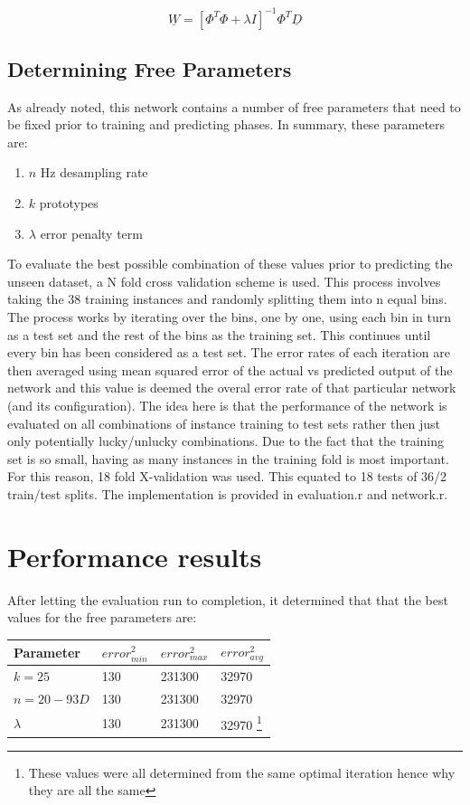 \documentclass[twocolumn]{article}
\begin{document}
\[
\underline{W} = [\Phi^T \Phi + \lambda I]^{-1} \Phi^T \underline{D}
\]

\subsection{Determining Free Parameters}
As already noted, this network contains a number of free parameters that need to be fixed prior to training and predicting phases.
In summary, these parameters are:

\begin{enumerate}
	\item $n$ Hz desampling rate
	\item $k$ prototypes
	\item $\lambda$ error penalty term
\end{enumerate}

To evaluate the best possible combination of these values prior to predicting the unseen dataset, a N fold cross validation scheme is
used. This process involves taking the 38 training instances and randomly splitting them into n equal bins. The process works by iterating over the
bins, one by one, using each bin in turn as a test set and the rest of the bins as the training set. This continues until every bin has been
considered as a test set. The error rates of each iteration are then averaged using mean squared error of the actual vs predicted output of the network
and this value is deemed the overal error rate of that particular network (and its configuration). The idea here is that the performance of the 
network is evaluated on all combinations of instance training to test sets rather then just only potentially lucky/unlucky combinations. 
Due to the fact that the training set is so small, having as many instances in the training fold is most important. For this reason, 
18 fold X-validation was used. This equated to 18 tests of 36/2 train/test splits. The implementation is provided in evaluation.r and network.r.

\section{Performance results}
After letting the evaluation run to completion, it determined that that the best values for the free parameters are:

\begin{center}
	\begin{tabular}{| p{15mm} | p{15mm} | p{15mm} | p{15mm} | }
	\hline Parameter & $error_{min}^2$ & $error_{max}^2$ & $error_{avg}^2$\\ \hline
	\( k=25\) & 130 & 231300 & 32970 \\ \hline
	\( n=20 - 93D\) & 130 & 231300 & 32970 \\ \hline
	\( \lambda\) & 130 & 231300 & 32970 \footnote{These values were all determined from the same optimal iteration hence why they are all the same}\\ \hline
	\end{tabular} 
\end{center}
\end{document}
